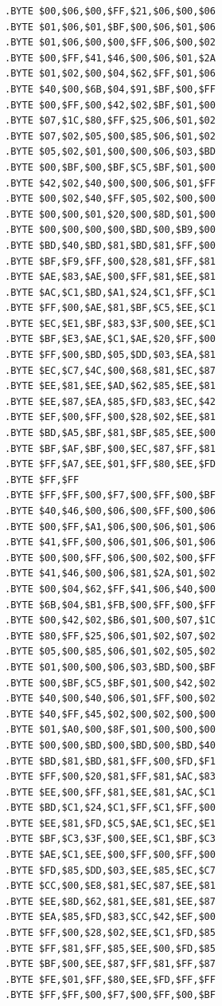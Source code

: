\begin{minipage}[b]{0.33\linewidth}
\begin{lrbox}{\mybox}%
\begin{lstlisting}[basicstyle=\ttfamily\tiny]
.BYTE $00,$06,$00,$FF,$21,$06,$00,$06
.BYTE $01,$06,$01,$BF,$00,$06,$01,$06
.BYTE $01,$06,$00,$00,$FF,$06,$00,$02
.BYTE $00,$FF,$41,$46,$00,$06,$01,$2A
.BYTE $01,$02,$00,$04,$62,$FF,$01,$06
.BYTE $40,$00,$6B,$04,$91,$BF,$00,$FF
.BYTE $00,$FF,$00,$42,$02,$BF,$01,$00
.BYTE $07,$1C,$80,$FF,$25,$06,$01,$02
.BYTE $07,$02,$05,$00,$85,$06,$01,$02
.BYTE $05,$02,$01,$00,$00,$06,$03,$BD
.BYTE $00,$BF,$00,$BF,$C5,$BF,$01,$00
.BYTE $42,$02,$40,$00,$00,$06,$01,$FF
.BYTE $00,$02,$40,$FF,$05,$02,$00,$00
.BYTE $00,$00,$01,$20,$00,$8D,$01,$00
.BYTE $00,$00,$00,$00,$BD,$00,$B9,$00
.BYTE $BD,$40,$BD,$81,$BD,$81,$FF,$00
.BYTE $BF,$F9,$FF,$00,$28,$81,$FF,$81
.BYTE $AE,$83,$AE,$00,$FF,$81,$EE,$81
.BYTE $AC,$C1,$BD,$A1,$24,$C1,$FF,$C1
.BYTE $FF,$00,$AE,$81,$BF,$C5,$EE,$C1
.BYTE $EC,$E1,$BF,$83,$3F,$00,$EE,$C1
.BYTE $BF,$E3,$AE,$C1,$AE,$20,$FF,$00
.BYTE $FF,$00,$BD,$05,$DD,$03,$EA,$81
.BYTE $EC,$C7,$4C,$00,$68,$81,$EC,$87
.BYTE $EE,$81,$EE,$AD,$62,$85,$EE,$81
.BYTE $EE,$87,$EA,$85,$FD,$83,$EC,$42
.BYTE $EF,$00,$FF,$00,$28,$02,$EE,$81
.BYTE $BD,$A5,$BF,$81,$BF,$85,$EE,$00
.BYTE $BF,$AF,$BF,$00,$EC,$87,$FF,$81
.BYTE $FF,$A7,$EE,$01,$FF,$80,$EE,$FD
.BYTE $FF,$FF
.BYTE $FF,$FF,$00,$F7,$00,$FF,$00,$BF
.BYTE $40,$46,$00,$06,$00,$FF,$00,$06
.BYTE $00,$FF,$A1,$06,$00,$06,$01,$06
.BYTE $41,$FF,$00,$06,$01,$06,$01,$06
.BYTE $00,$00,$FF,$06,$00,$02,$00,$FF
.BYTE $41,$46,$00,$06,$81,$2A,$01,$02
.BYTE $00,$04,$62,$FF,$41,$06,$40,$00
.BYTE $6B,$04,$B1,$FB,$00,$FF,$00,$FF
.BYTE $00,$42,$02,$B6,$01,$00,$07,$1C
.BYTE $80,$FF,$25,$06,$01,$02,$07,$02
.BYTE $05,$00,$85,$06,$01,$02,$05,$02
.BYTE $01,$00,$00,$06,$03,$BD,$00,$BF
.BYTE $00,$BF,$C5,$BF,$01,$00,$42,$02
.BYTE $40,$00,$40,$06,$01,$FF,$00,$02
.BYTE $40,$FF,$45,$02,$00,$02,$00,$00
.BYTE $01,$A0,$00,$8F,$01,$00,$00,$00
.BYTE $00,$00,$BD,$00,$BD,$00,$BD,$40
.BYTE $BD,$81,$BD,$81,$FF,$00,$FD,$F1
.BYTE $FF,$00,$20,$81,$FF,$81,$AC,$83
.BYTE $EE,$00,$FF,$81,$EE,$81,$AC,$C1
.BYTE $BD,$C1,$24,$C1,$FF,$C1,$FF,$00
.BYTE $EE,$81,$FD,$C5,$AE,$C1,$EC,$E1
.BYTE $BF,$C3,$3F,$00,$EE,$C1,$BF,$C3
.BYTE $AE,$C1,$EE,$00,$FF,$00,$FF,$00
.BYTE $FD,$85,$DD,$03,$EE,$85,$EC,$C7
.BYTE $CC,$00,$E8,$81,$EC,$87,$EE,$81
.BYTE $EE,$8D,$62,$81,$EE,$81,$EE,$87
.BYTE $EA,$85,$FD,$83,$CC,$42,$EF,$00
.BYTE $FF,$00,$28,$02,$EE,$C1,$FD,$85
.BYTE $FF,$81,$FF,$85,$EE,$00,$FD,$85
.BYTE $BF,$00,$EE,$87,$FF,$81,$FF,$87
.BYTE $FE,$01,$FF,$80,$EE,$FD,$FF,$FF
.BYTE $FF,$FF,$00,$F7,$00,$FF,$00,$BF

\end{lstlisting}
\end{lrbox}
\end{minipage}
